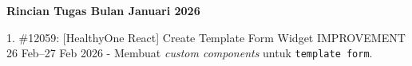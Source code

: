 
\textbf{Rincian Tugas Bulan Januari 2026}
\begin{tasktable}

    \taskentry
    {1.}
    {
        \#12059: [HealthyOne React] Create Template Form Widget
    }{IMPROVEMENT}{
        26 Feb--27 Feb 2026
    }{-}{
        Membuat \textit{custom components} untuk \texttt{template form}.
    }



\end{tasktable}